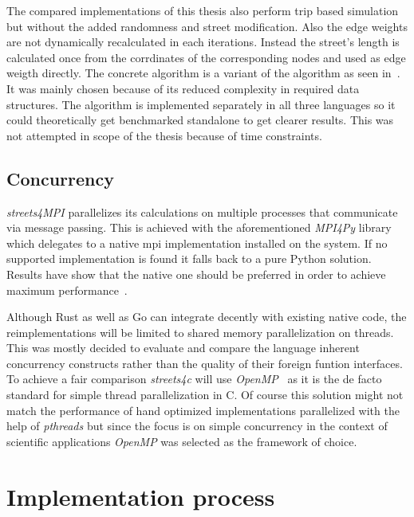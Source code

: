 The compared implementations of this thesis also perform trip based simulation but without the added randomness and street modification. Also the edge weights are not dynamically recalculated in each iterations. Instead the street's length is calculated once from the corrdinates of the corresponding nodes and used as edge weigth directly. The concrete algorithm is a variant of the  algorithm as seen in~\cite[p. 16]{dijkstra_utcs}. It was mainly chosen because of its reduced complexity in required data structures. The algorithm is implemented separately in all three languages so it could theoretically get benchmarked standalone to get clearer results. This was not attempted in scope of the thesis because of time constraints.

\subsection*{Concurrency}
\label{subsec:Concept::Differences::Concurrency}

\textit{streets4MPI} parallelizes its calculations on multiple processes that communicate via message passing. This is achieved with the aforementioned \textit{MPI4Py} library which delegates to a native \gls{mpi} implementation installed on the system. If no supported implementation is found it falls back to a pure Python solution. Results have show that the native one should be preferred in order to achieve maximum performance~\cite{streets_report}.

Although Rust as well as Go can integrate decently with existing native code, the reimplementations will be limited to shared memory parallelization on threads. This was mostly decided to evaluate and compare the language inherent concurrency constructs rather than the quality of their foreign funtion interfaces. To achieve a fair comparison \textit{streets4c} will use \textit{OpenMP}~ as it is the de facto standard for simple thread parallelization in C. Of course this solution might not match the performance of hand optimized implementations parallelized with the help of \textit{pthreads} but since the focus is on simple concurrency in the context of scientific applications \textit{OpenMP} was selected as the framework of choice.

\section{Implementation process}
\label{sec:Concept::Implementation}

